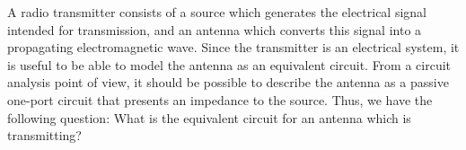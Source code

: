 

\label{m0202_Equivalent_Circuit_Model_for_Transmission} %

A radio transmitter consists of a source which generates the electrical signal intended for transmission, and an antenna which converts this signal into a propagating electromagnetic wave.  Since the transmitter is an electrical system, it is useful to be able to model the antenna as an equivalent circuit. 
From a circuit analysis point of view, it should be possible to describe the antenna as a passive one-port circuit that presents an impedance to the source.
Thus, we have the following question: What is the equivalent circuit for an antenna which is transmitting?

